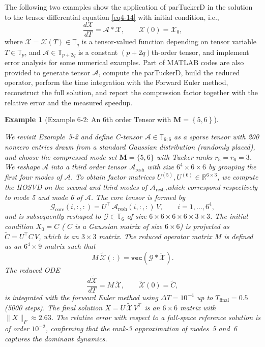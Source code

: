\documentclass[11pt, oneside]{article}  %
\newtheorem{exm}[thm]{Example}
\newcommand{\norm}[1]{\parallel\! #1\! \parallel}
\newcommand{\set}[1]{\left\{#1\right\}}
\newcommand{\vecc}{\texttt{vec}}
\newcommand{\RR}{\mathbb{R}}
\newcommand{\TT}{\mathbb{T}}
\newcommand{\A}{\mathcal{A}}
\newcommand{\caG}{\mathcal{G}}
\newcommand{\caM}{\mathbf{M}}
\newcommand{\X}{\mathcal{X}}
\newcommand{\ttX}{\tilde{\X}}
\newcommand{\beq}{\begin{equation}}
\newcommand{\eeq}{\end{equation}}
\begin{document}
The following two examples show the application of parTuckerD in the solution to the tensor differential equation \eqref{eq4-14} with initial condition, i.e.,   
\beq\label{eq6-1}
\frac{d\X}{dT} = \A \ast \X, \qquad \X(0) = \X_0,
\eeq
where $\X=\X(T)\in\TT_{q}$ is a tensor-valued function depending on tensor variable $T\in\TT_{p}$, and $\A\in\TT_{p+2q}$ is a constant 
$(p+2q)$th-order tensor, and implement error analysis for some numerical examples. Part of MATLAB codes are also provided to generate tensor 
$\A$, compute the parTuckerD, build the reduced operator, perform the time integration with the Forward Euler method, reconstruct the full solution, 
and report the compression factor together with the relative error and the measured speedup.

\begin{exm}[Example 6-2: An 6th order Tensor with $\caM=\set{5,6}$]
\label{exm6-2}

We revisit Example~5-2 and define C-tensor $\A\in\TT_{6;6}$ as a sparse tensor with 200 nonzero entries drawn from a standard Gaussian 
distribution (randomly placed), and choose the compressed mode set $\caM=\{5,6\}$ with Tucker ranks $r_5 = r_6 =3$.  We reshape $\A$ into a 
third order tensor $\A_{\text{resh}}$ with size $6^4\times 6\times 6$ by grouping the first four modes of $\A$.  To obtain factor matrices 
$U^{(5)}, U^{(6)}\in\RR^{6\times 3}$, we compute the HOSVD on the second and third modes of $\A_{\text{resh}}$,which correspond 
respectively to mode 5 and mode 6 of $\A$. The core tensor is formed by
\[
\caG_{\text{core}}(i, :, :) = U^\top \, \A_{\text{resh}}(i,:,:)\,V, \qquad i=1,\dots, 6^4,
\]
and is subsequently reshaped to $\caG\in\TT_{6}$ of size $6\times 6 \times 6 \times 6\times3\times3$. The initial condition $X_0 = C$ ( $C$ is a 
Gaussian matrix of size $6\times 6$) is projected as $\tilde{C} = U^\top C \,V$, which is an $3\times3$ matrix. The reduced operator matrix $M$
is defined as an $6^{4}\times 9$ matrix such that 
\[
M\,\ttX(:) = \vecc(\caG\ast \ttX).
\]  
The reduced ODE
\[
\frac{d\ttX}{dT} = M\,\ttX, \qquad \ttX(0)=\tilde{C},
\]
is integrated with the forward Euler method using $\Delta T=10^{-4}$ up to $T_{\text{final}}=0.5$ (5000 steps). The final solution $X =U\,\ttX \,V^\top$ is an $6\times 6$ matrix with $\norm{X}_F\approx 2.63$.  The relative error with respect to a full-space reference solution is of order 
$10^{-2}$, confirming that the rank-3 approximation of  modes~5 and~6 captures the dominant dynamics.  
\end{exm}
\end{document}
